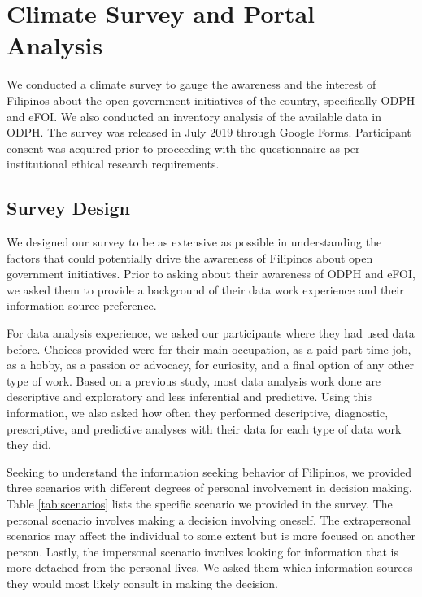 \documentclass{sigchi}
\begin{document}
\section{Climate Survey and Portal Analysis}
We conducted a climate survey to gauge the awareness and the interest of Filipinos about the open government initiatives of the country, specifically ODPH and eFOI. We also conducted an inventory analysis of the available data in ODPH. The survey was released in July 2019 through Google Forms. Participant consent was acquired prior to proceeding with the questionnaire as per institutional ethical research requirements.

\subsection{Survey Design}
We designed our survey to be as extensive as possible in understanding the factors that could potentially drive the awareness of Filipinos about open government initiatives. Prior to asking about their awareness of ODPH and eFOI, we asked them to provide a background of their data work experience and their information source preference.

For data analysis experience, we asked our participants where they had used data before. Choices provided were for their main occupation, as a paid part-time job, as a hobby, as a passion or advocacy, for curiosity, and a final option of any other type of work. Based on a previous study, most data analysis work done are descriptive and exploratory and less inferential and predictive\cite{choi2017characteristics}. Using this information, we also asked how often they performed descriptive, diagnostic,  prescriptive, and predictive analyses with their data for each type of data work they did.

Seeking to understand the information seeking behavior of Filipinos, we provided three scenarios with different degrees of personal involvement in decision making. Table \ref{tab:scenarios} lists the specific scenario we provided in the survey. The personal scenario involves making a decision involving oneself. The extrapersonal scenarios may affect the individual to some extent but is more focused on another person. Lastly, the impersonal scenario involves looking for information that is more detached from the personal lives. We asked them which information sources they would most likely consult in making the decision.
\end{document}
